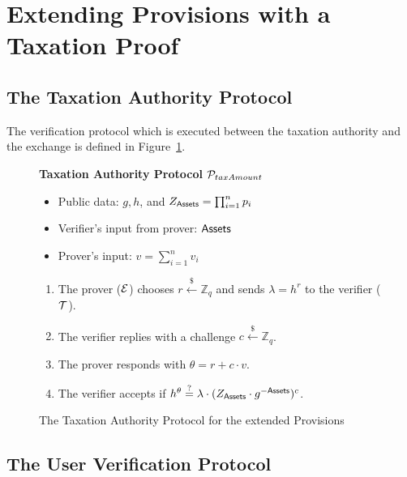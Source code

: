 \section{Extending Provisions with a Taxation Proof}\label{sec:provisions-extension}

\subsection{The Taxation Authority Protocol}\label{subsec:tax-authority-proto}

The verification protocol which is executed between the taxation authority and the exchange
is defined in Figure~\ref{fig:taxation_auth_proto}.

\begin{figure}[h]
\begin{mdframed}

\begin{center}
    \textbf{Taxation Authority Protocol} $\mathcal{P}_{taxAmount}$
\end{center}

    \begin{itemize}[$\cdot$]
        \item Public data: $g, h$, and $Z_{\mathsf{Assets}} = \prod_{i = 1}^n p_i$
        \item Verifier's input from prover: $\mathsf{Assets}$
        \item Prover's input: $v = \sum_{i = 1}^n v_i$
    \end{itemize}

    \begin{enumerate}
        \item The prover ($\mathcal{E}$) chooses $r \xleftarrow{\$} \mathbb{Z}_q$
            and sends $\lambda = h^r$ to the verifier ($\mathcal{T}$).
        \item The verifier replies with a challenge $c \xleftarrow{\$} \mathbb{Z}_q$.
        \item The prover responds with $\theta = r + c \cdot v$.
        \item The verifier accepts if $h^\theta \stackrel{?}{=} \lambda \cdot (Z_{\mathsf{Assets}} \cdot g^{-\mathsf{Assets}})^c$.
    \end{enumerate}

\end{mdframed}
\caption{The Taxation Authority Protocol for the extended Provisions}
\label{fig:taxation_auth_proto}
\end{figure}

\subsection{The User Verification Protocol}\label{subsec:user-verification-proto}

